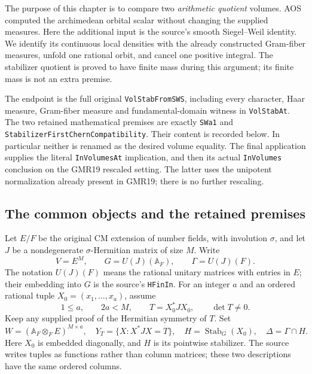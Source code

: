 \documentclass[11pt,a4paper]{article}
\numberwithin{equation}{section}
\theoremstyle{remark}\newtheorem{remark}[theorem]{Remark}
\begin{document}
The purpose of this chapter is to compare two \emph{arithmetic quotient}
volumes.  AOS computed the archimedean orbital scalar without changing
the supplied measures.  Here the additional input is the source's
smooth Siegel--Weil identity.  We identify its continuous local densities
with the already constructed Gram-fiber measures, unfold one rational
orbit, and cancel one positive integral.  The stabilizer quotient is
proved to have finite mass during this argument; its finite mass is
not an extra premise.

The endpoint is the full original \texttt{Vol\allowbreak Stab\allowbreak From\allowbreak SWS}, including
every character, Haar measure, Gram-fiber measure and fundamental-domain
witness in \texttt{Vol\allowbreak Stab\allowbreak At}.  The two retained mathematical premises
are exactly \texttt{SWa1} and
\texttt{Stabilizer\allowbreak First\allowbreak Chern}\allowbreak\texttt{Compatibility}.  Their content is recorded
below.  In particular neither is renamed as the desired volume equality.
The final application supplies the literal \texttt{In\allowbreak Volumes\allowbreak At}
implication, and then its actual \texttt{In\allowbreak Volumes} conclusion on the
GMR19 rescaled setting.  The latter uses the unipotent normalization
already present in GMR19; there is no further rescaling.

\subsection{The common objects and the retained premises}

Let $E/F$ be the original CM extension of number fields, with involution
$\sigma$, and let $J$ be a nondegenerate $\sigma$-Hermitian matrix of
size $M$.  Write
\[
 V=E^M,\qquad G=U(J)(\mathbb A_F),\qquad \Gamma=U(J)(F).
 \tag{SVW.1}
\]
The notation $U(J)(F)$ means the rational unitary matrices with entries
in $E$; their embedding into $G$ is the source's
\texttt{HFin\allowbreak In}.  For an integer $a$ and an ordered rational tuple
$X_0=(x_1,\ldots,x_a)$, assume
\[
 1\leq a,\qquad 2a<M,\qquad T=X_0^*JX_0,\qquad \det T\ne0.
 \tag{SVW.2}
\]
Keep any supplied proof of the Hermitian symmetry of $T$.  Set
\[
 W=(\mathbb A_F\otimes_F E)^{M\times a},\quad
 Y_T=\{X:X^*JX=T\},\quad H=\operatorname{Stab}_G(X_0),\quad
 \Delta=\Gamma\cap H.
 \tag{SVW.3}
\]
Here $X_0$ is embedded diagonally, and $H$ is its pointwise stabilizer.
The source writes tuples as functions rather than column matrices;
these two descriptions have the same ordered columns.
\end{document}
